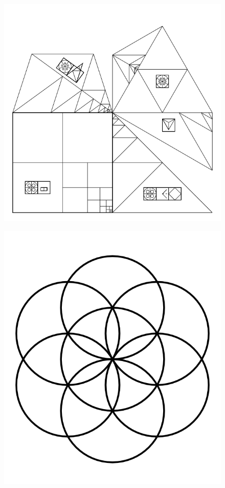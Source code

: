 \documentclass[17pt]{extreport}
\begin{document}
	\begin{figure}
		\centering
		\includegraphics[width=7.75in]{imageserver/uploadimages/shapes.png}
	\end{figure}	
	\begin{figure}
		\centering
		\includegraphics[width=6.25in]{imageserver/uploadimages/circles6.png}
	\end{figure}	
\end{document}
